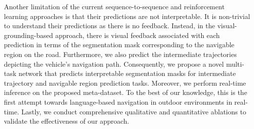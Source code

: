 \documentclass[11pt]{article}
\begin{document}
Another limitation of the current sequence-to-sequence and reinforcement learning approaches is that their predictions are not interpretable. It is non-trivial to understand their predictions as there is no feedback. Instead, in the visual-grounding-based approach, there is visual feedback associated with each prediction in terms of the segmentation mask corresponding to the navigable region on the road. Furthermore, we also predict the intermediate trajectories depicting the vehicle's navigation path. Consequently, we propose a novel multi-task network that predicts interpretable segmentation masks for intermediate trajectory and navigable region prediction tasks. Moreover, we perform real-time inference on the proposed meta-dataset. To the best of our knowledge, this is the first attempt towards language-based navigation in outdoor environments in real-time. Lastly, we conduct comprehensive qualitative and quantitative ablations to validate the effectiveness of our approach.






\end{document}
